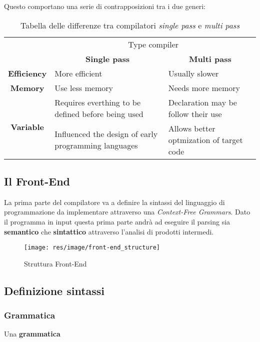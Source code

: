 Questo comportano una serie di contrapposizioni tra i due generi:
\begin{table}[H]
\begin{center}
\begin{tabular}{p{3cm}|p{5cm}|p{5cm}|}
\cline{2-3}
& \multicolumn{2}{|c|}{Type compiler} \\ \cline{2-3}
& \multicolumn{1}{c|}{\textbf{Single pass}} &
\multicolumn{1}{c|}{\textbf{Multi pass}} \\ \hline
\multicolumn{1}{|c|}{\textbf{Efficiency}} &
More efficient & Usually slower \\ \hline
\multicolumn{1}{|c|}{\textbf{Memory}} & Use less memory &
Needs more memory \\ \hline
\multicolumn{1}{|c|}{\multirow{2}{*}{\textbf{Variable}}} &
Requires everthing to be defined before being used &
Declaration may be follow their use \\ \hline
\multicolumn{1}{|c|}{\multirow{2}{*}{\textbf{Feature}}} &
Influenced the design of early programming languages &
Allows better optmization of target code \\ \hline
\end{tabular}
\end{center}
\caption{
Tabella delle differenze tra compilatori \textit{single pass} e
\textit{multi pass}
}
\label{tab:difference_single_multi_pass_compilers}
\end{table}

\subsection{Il Front-End}
\label{sec:front-end}
La prima parte del compilatore va a definire la sintassi del linguaggio di
programmazione da implementare attraverso una \textit{Context-Free Grammars}.
Dato il programma in input questa prima parte andrà ad eseguire il parsing sia
\textbf{semantico} che \textbf{sintattico} attraverso l'analisi di prodotti
intermedi.

\begin{figure}[H]
  \texttt{[image: res/image/front-end\_structure]}
  \caption{Struttura Front-End}
  \label{fig:front-end_structure}
\end{figure}

\subsection{Definizione sintassi}
\label{sec:definizione_sintassi}
\subsubsection{Grammatica}
\label{sec:grammatica}
\begin{definition}
Una \textbf{grammatica}
\end{definition}
